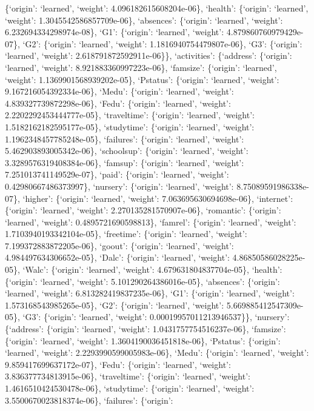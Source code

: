 \documentclass[
]{article}
\begin{document}
\{`origin': `learned', `weight': 4.096182615608204e-06\}, `health':
\{`origin': `learned', `weight': 1.3045542586857709e-06\}, `absences':
\{`origin': `learned', `weight': 6.232694334298974e-08\}, `G1':
\{`origin': `learned', `weight': 4.879860760979429e-07\}, `G2':
\{`origin': `learned', `weight': 1.1816940754479807e-06\}, `G3':
\{`origin': `learned', `weight': 2.618791872592911e-06\}\},
`activities': \{`address': \{`origin': `learned', `weight':
8.921883360997223e-06\}, `famsize': \{`origin': `learned', `weight':
1.1369901568939202e-05\}, `Pstatus': \{`origin': `learned', `weight':
9.167216054392334e-06\}, `Medu': \{`origin': `learned', `weight':
4.839327739872298e-06\}, `Fedu': \{`origin': `learned', `weight':
2.2202292453444777e-05\}, `traveltime': \{`origin': `learned', `weight':
1.5182162182595177e-05\}, `studytime': \{`origin': `learned', `weight':
1.1962348457785248e-05\}, `failures': \{`origin': `learned', `weight':
5.462903893005342e-06\}, `schoolsup': \{`origin': `learned', `weight':
3.3289576319408384e-06\}, `famsup': \{`origin': `learned', `weight':
7.251013741149529e-07\}, `paid': \{`origin': `learned', `weight':
0.42980667486373997\}, `nursery': \{`origin': `learned', `weight':
8.75089591986338e-07\}, `higher': \{`origin': `learned', `weight':
7.063695630694698e-06\}, `internet': \{`origin': `learned', `weight':
2.270135281570907e-06\}, `romantic': \{`origin': `learned', `weight':
0.4895721690598813\}, `famrel': \{`origin': `learned', `weight':
1.7103940193342104e-05\}, `freetime': \{`origin': `learned', `weight':
7.199372883872205e-06\}, `goout': \{`origin': `learned', `weight':
4.984497634306652e-05\}, `Dalc': \{`origin': `learned', `weight':
4.86850586028225e-05\}, `Walc': \{`origin': `learned', `weight':
4.679631804837704e-05\}, `health': \{`origin': `learned', `weight':
5.101290264386016e-05\}, `absences': \{`origin': `learned', `weight':
6.813282419837235e-06\}, `G1': \{`origin': `learned', `weight':
1.573168543985265e-05\}, `G2': \{`origin': `learned', `weight':
5.669885412547309e-05\}, `G3': \{`origin': `learned', `weight':
0.00019957011213946537\}\}, `nursery': \{`address': \{`origin':
`learned', `weight': 1.0431757754516237e-06\}, `famsize': \{`origin':
`learned', `weight': 1.3604190036451818e-06\}, `Pstatus': \{`origin':
`learned', `weight': 2.2293990599005983e-06\}, `Medu': \{`origin':
`learned', `weight': 9.859417699637172e-07\}, `Fedu': \{`origin':
`learned', `weight': 3.836377734813915e-06\}, `traveltime': \{`origin':
`learned', `weight': 1.4616510424530478e-06\}, `studytime': \{`origin':
`learned', `weight': 3.5500670023818374e-06\}, `failures': \{`origin':
\end{document}
